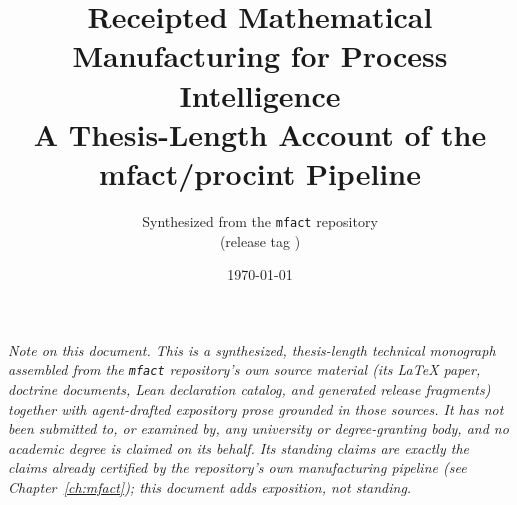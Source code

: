 \documentclass[11pt,oneside]{report}
\title{\Large Receipted Mathematical Manufacturing for Process Intelligence\\[0.3em]
\large A Thesis-Length Account of the mfact/procint Pipeline}
\author{Synthesized from the \texttt{mfact} repository\\(release tag \ReleaseTag)}
\date{\today}
\begin{document}
\maketitle

\thispagestyle{empty}
\vspace{-2em}
\begin{center}
\begin{minipage}{0.85\textwidth}
\small\itshape
\noindent Note on this document. This is a synthesized, thesis-length
technical monograph assembled from the \texttt{mfact} repository's own
source material (its LaTeX paper, doctrine documents, Lean declaration
catalog, and generated release fragments) together with agent-drafted
expository prose grounded in those sources. It has not been submitted to,
or examined by, any university or degree-granting body, and no academic
degree is claimed on its behalf. Its standing claims are exactly the
claims already certified by the repository's own manufacturing pipeline
(see Chapter~\ref{ch:mfact}); this document adds exposition, not standing.
\end{minipage}
\end{center}
\clearpage

\tableofcontents
\clearpage
{}














\end{document}
